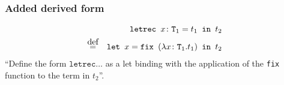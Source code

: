 \subsubsection{Added derived form \cite{pierce2002ProgLang}}
\begin{equation*}
    \begin{split}
        \texttt{letrec } x \colon \texttt{T}_1 = t_1 \texttt{ in } t_2 \\
        \defeq \quad \texttt{let } x = \texttt{fix } (\lambda x \colon \texttt{T}_1 . t_1) \texttt{ in } t_2
    \end{split}
\end{equation*}
``Define the form $\texttt{letrec} \dots$ as a let binding with the application of
the \texttt{fix} function to the term in $t_2$''.

